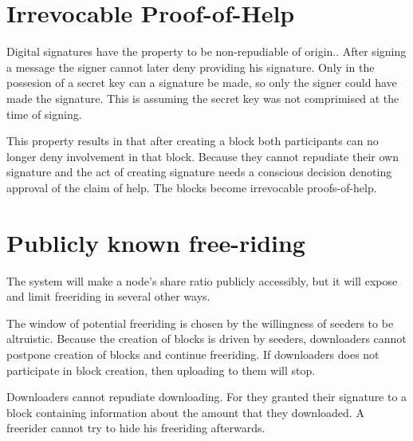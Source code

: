 \section{Irrevocable Proof-of-Help}
Digital signatures have the property to be non-repudiable of origin.\cite{VanderLubbe-crypto}.
After signing a message the signer cannot later deny providing his signature.
Only in the possesion of a secret key can a signature be made,
so only the signer could have made the signature.
This is assuming the secret key was not comprimised at the time of signing.

This property results in that after creating a block
both participants can no longer deny involvement in that block.
Because they cannot repudiate their own signature
and the act of creating signature needs a conscious decision denoting approval of the claim of help.
The blocks become irrevocable proofs-of-help.

\section{Publicly known free-riding}
The system will make a node's share ratio publicly accessibly,
but it will expose and limit freeriding in several other ways.

The window of potential freeriding is chosen by the willingness of seeders to be altruistic.
Because the creation of blocks is driven by seeders,
downloaders cannot postpone creation of blocks and continue freeriding.
If downloaders does not participate in block creation,
then uploading to them will stop.

Downloaders cannot repudiate downloading.
For they granted their signature to a block containing information about the amount that they downloaded.
A freerider cannot try to hide his freeriding afterwards.
